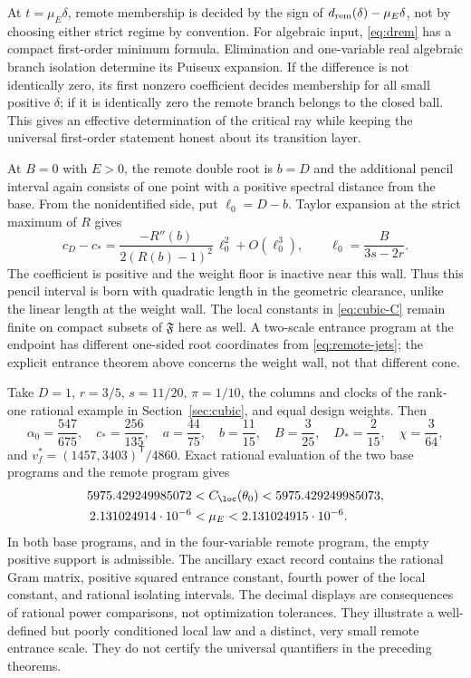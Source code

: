 \begin{remark}
At $t=\mu_E\delta$, remote membership is decided by the sign of
$d_{\rm rem}(\delta)-\mu_E\delta$, not by choosing either strict regime
by convention. For algebraic input, \eqref{eq:drem} has a compact
first-order minimum formula. Elimination and one-variable real algebraic
branch isolation determine its Puiseux expansion. If the difference is
not identically zero, its first nonzero coefficient decides membership
for all small positive $\delta$; if it is identically zero the remote
branch belongs to the closed ball. This gives an effective determination
of the critical ray while keeping the universal first-order statement
honest about its transition layer.
\end{remark}

\begin{remark}
At $B=0$ with $E>0$, the remote double root is $b=D$ and the additional
pencil interval again consists of one point with a positive spectral
distance from the base. From the nonidentified side, put $\ell_0=D-b$.
Taylor expansion at the strict maximum of $R$ gives
\[
 c_D-c_*=
 \frac{-R''(b)}{2(R(b)-1)^2}\,\ell_0^2+O(\ell_0^3),\qquad
 \ell_0=\frac{B}{3s-2r}.
\]
The coefficient is positive and the weight floor is inactive near this
wall. Thus this pencil interval is born with quadratic length in the
geometric clearance, unlike the linear length at the weight wall.
The local constants in \eqref{eq:cubic-C} remain finite on compact
subsets of $\mathfrak F$ here as well. A two-scale entrance program at
the endpoint has different one-sided root coordinates from
\eqref{eq:remote-jets}; the explicit entrance theorem above concerns
the weight wall, not that different cone.
\end{remark}

\begin{example}\label{ex:wall-exact}
Take $D=1$, $r=3/5$, $s=11/20$, $\pi=1/10$, the columns and clocks
of the rank-one rational example in Section~\ref{sec:cubic}, and equal
design weights. Then
\[
 \alpha_0=\frac{547}{675},\quad c_*=\frac{256}{135},\quad
 a=\frac{44}{75},\quad b=\frac{11}{15},\quad
 B=\frac3{25},\quad D_*=\frac2{15},\quad\chi=\frac3{64},
\]
and $v_f^*=(1457,3403)^{\mathsf T}/4860$. Exact rational evaluation
of the two base programs and the remote program gives
\begin{align*}
 5975.429249985072&<C_{\loc}(\theta_0)<5975.429249985073,\\
 2.131024914\cdot10^{-6}&<\mu_E<2.131024915\cdot10^{-6}.
\end{align*}
In both base programs, and in the four-variable remote program, the
empty positive support is admissible. The ancillary exact record
contains the rational Gram matrix, positive squared entrance constant,
fourth power of the local constant, and rational isolating intervals.
The decimal displays are consequences of rational power comparisons,
not optimization tolerances. They illustrate a well-defined but poorly
conditioned local law and a distinct, very small remote entrance scale.
They do not certify the universal quantifiers in the preceding theorems.
\end{example}


